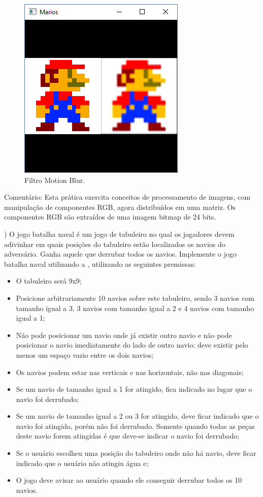 \begin{renumerate}
  \begin{figure}[H]
    \centerline{\includegraphics[width=.3\textwidth]{img/cap2_ex27.png}}
    \caption{Filtro Motion Blur.}
    \label{fig:cap02_ex27}
  \end{figure}

Comentário: Esta prática exercita conceitos de processamento de imagens, com manipulação de componentes RGB, agora distribuídos em uma matriz. Os componentes RGB são extraídos de uma imagem bitmap de 24 bits.

%

  \item)
  O jogo batalha naval é um jogo de tabuleiro no qual os jogadores devem adivinhar em quais posições do tabuleiro estão localizados os navios do adversário. Ganha aquele que derrubar todos os navios.
Implemente o jogo batalha naval utilizando a \playAPC{}, utilizando as seguintes premissas:
\begin{itemize}
  \item O tabuleiro será 9x9;
  \item Posicione arbitrariamente 10 navios sobre este tabuleiro, sendo 3 navios com tamanho igual a 3, 3 navios com tamanho igual a 2 e 4 navios com tamanho igual a 1;
  \item Não pode posicionar um navio onde já existir outro navio e não pode posicionar o navio imediatamente do lado de outro navio: deve existir pelo menos um espaço vazio entre os dois navios;
  \item Os navios podem estar nas verticais e nas horizontais, não nas diagonais;
  \item Se um navio de tamanho igual a 1 for atingido, fica indicado no lugar que o navio foi derrubado;
  \item Se um navio de tamanho igual a 2 ou 3 for atingido, deve ficar indicado que o navio foi atingido, porém não foi derrubado. Somente quando todas as peças deste navio forem atingidas é que deve-se indicar o navio foi derrubado;
  \item Se o usuário escolheu uma posição do tabuleiro onde não há navio, deve ficar indicado que o usuário não atingiu água e;
  \item O jogo deve avisar ao usuário quando ele conseguir derrubar todos os 10 navios.
\end{itemize}


\end{renumerate}
